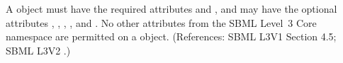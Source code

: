 A \Compartment object must have the required attributes  and
, and may have the optional attributes ,
, , ,  and
.  No other attributes from the SBML Level~3 Core namespace
are permitted on a \Compartment object.  (References: SBML L3V1 Section 4.5; SBML L3V2
.)
